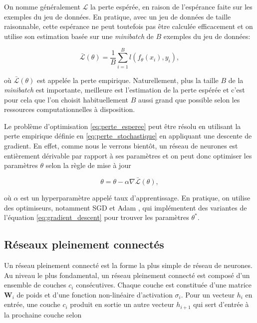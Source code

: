 On nomme généralement $\mathcal{L}$ la perte espérée, en raison de l'espérance faite 
sur les exemples du jeu de données.
En pratique, avec un jeu de données de taille raisonnable,
cette espérance ne peut toutefois pas être calculée efficacement et 
on utilise son estimation basée sur une \textit{minibatch} de 
$B$ exemples du jeu de données:

\begin{equation}
    \bar{\mathcal{L}}(\theta) =  \frac{1}{B} \displaystyle\sum_{i=1}^B l\left(f_{\theta}(x_i), y_i\right),
    \label{eq:perte_stochastique}
\end{equation}

où $\bar{\mathcal{L}}(\theta)$ est appelée la perte empirique.
Naturellement, plus la taille $B$ de la \textit{minibatch} est importante,
meilleure est l'estimation de la perte espérée et c'est pour cela 
que l'on choisit habituellement $B$ aussi grand que possible selon les 
ressources computationnelles à disposition.

Le problème d'optimisation \eqref{eq:perte_esperee} peut être résolu en
utilisant la perte empirique définie en \eqref{eq:perte_stochastique}
en appliquant une descente de gradient.
En effet, comme nous le verrons bientôt, un réseau de neurones 
est entièrement dérivable par rapport à ses paramètres et 
on peut donc optimiser les paramètres $\theta$ selon la 
règle de mise à jour 

\begin{equation}
    \theta = \theta - \alpha \nabla \bar{\mathcal{L}}(\theta),
    \label{eq:gradient_descent}
\end{equation}

où $\alpha$ est un hyperparamètre appelé taux d'apprentissage.
En pratique, on utilise des optimiseurs, notamment SGD \citep{robbins1951stochastic}
et Adam \citep{kingma2014method}, qui implémentent des variantes 
de l'équation \eqref{eq:gradient_descent} pour trouver les paramètres $\theta^*$.


\subsection{Réseaux pleinement connectés}
\label{subsec:FC}

Un réseau pleinement connecté est la forme la plus simple 
de réseau de neurones.
Au niveau le plus fondamental, un réseau pleinement connecté
est composé d'un ensemble de couches $c_i$ consécutives.
Chaque couche est constituée d'une matrice $\mathbf{W}_i$ de poids 
et d'une fonction non-linéaire d'activation $\sigma_i$.
Pour un vecteur $h_i$ en entrée, une couche $c_i$ produit en sortie 
un autre vecteur $h_{i+1}$ qui sert d'entrée à la prochaine couche selon 

